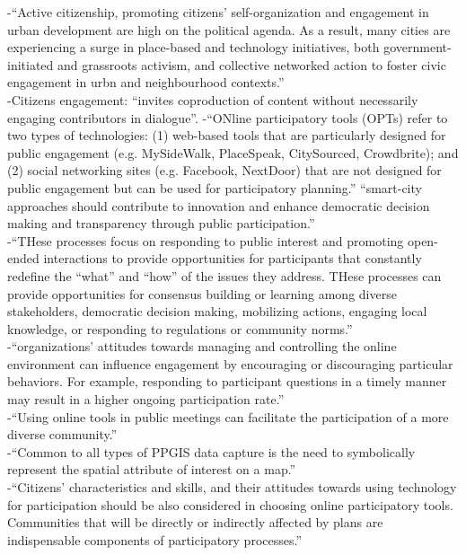 -{\color{orange}“Active citizenship, promoting citizens’ self-organization and engagement in urban development are high on the political agenda. As a result, many cities are experiencing a surge in place-based and technology initiatives, both government-initiated and grassroots activism, and collective networked action to foster civic engagement in urbn and neighbourhood contexts.”}\cite{Kleinhans2015}\\
-{\color{orange}Citizens engagement: “invites coproduction of content without necessarily engaging contributors in dialogue”.}
-{\color{orange}“ONline participatory tools (OPTs) refer to two types of technologies: (1) web-based tools that are particularly designed for public engagement (e.g. MySideWalk, PlaceSpeak, CitySourced, Crowdbrite); and (2) social networking sites (e.g. Facebook, NextDoor) that are not designed for public engagement but can be used for participatory planning.”
“smart-city approaches should contribute to innovation and enhance democratic decision making and transparency through public participation.”}\cite{Afzalan2017}\\
-{\color{orange}“THese processes focus on responding to public interest and promoting open-ended interactions to provide opportunities for participants that constantly redefine the “what” and “how” of the issues they address. THese processes can provide opportunities for consensus building or learning among diverse stakeholders, democratic decision making, mobilizing actions, engaging local knowledge, or responding to regulations or community norms.” }\cite{Afzalan2017}\\
-{\color{orange}“organizations’ attitudes towards managing and controlling the online environment can influence engagement by encouraging or discouraging particular behaviors. For example, responding to participant questions in a timely manner may result in a higher ongoing participation rate.”}\cite{Afzalan2017}\\
-{\color{orange}“Using online tools in public meetings can facilitate the participation of a more diverse community.”}\cite{Afzalan2017}\\
-{\color{orange}“Common to all types of PPGIS data capture is the need to symbolically represent the spatial attribute of interest on a map.”\cite{Brown2012}}\\
-{\color{orange}“Citizens’ characteristics and skills, and their attitudes towards using technology for participation should be also considered in choosing online participatory tools. Communities that will be directly or indirectly affected by plans are indispensable components of participatory processes.”}\cite{Afzalan2017}\\
